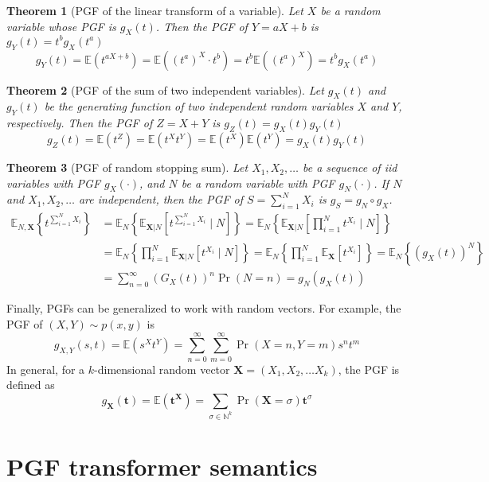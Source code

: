 \documentclass[a4paper]{article}
\newcommand{\E}{ \mathbb{E} }
\newtheorem{theorem}{Theorem}[section]
\begin{document}
\begin{theorem}[PGF of the linear transform of a variable]
	Let \(X\) be a random variable whose PGF is \(g_X(t)\).
	Then the PGF of \(Y=aX+b\) is \(g_Y(t) = t^b g_X(t^a)\)
	\[
		g_Y(t)
		= \E(t^{aX+b})
		= \E({(t^a)}^X \cdot t^b)
		= t^b \E({(t^a)}^X )
		= t^b g_X(t^a)
	\]
\end{theorem}
\begin{theorem}[PGF of the sum of two independent variables]
	Let \(g_X(t)\) and \(g_Y(t)\) be the generating function of two independent random variables \(X\) and \(Y\), respectively. Then the PGF of \(Z=X+Y\) is \(g_Z(t) = g_X(t)g_Y(t)\)
	\[
		g_Z(t) = \E(t^Z) = \E(t^X t^Y) = \E(t^X) \E(t^Y) = g_X(t) g_Y(t)
	\]
\end{theorem}
\begin{theorem}[PGF of random stopping sum]
	Let \(X_1, X_2, \ldots\) be a sequence of iid variables with PGF \(g_X(\cdot)\),
	and \(N\) be a random variable with PGF \(g_N(\cdot)\).
	If \(N\) and \(X_1,X_2,\ldots\) are independent, then the PGF of \(S=\sum_{i=1}^{N} X_i\) is \(g_S = g_N\circ g_X\).
	\begin{align*}
		\E_{N,\mathbf{X}}\left\{ t^{\sum_{i=1}^N X_i} \right\}
		 & = \E_N\left\{ \E_{\mathbf{X}|N}\left[ t^{\sum_{i=1}^N X_i} \mid N \right] \right\}
		= \E_N\left\{ \E_{\mathbf{X}|N}\left[ \prod_{i=1}^N t^{X_i} \mid N \right] \right\}     \\
		 & = \E_N\left\{ \prod_{i=1}^N \E_{\mathbf{X}|N}\left[  t^{X_i} \mid N \right] \right\}
		= \E_N\left\{ \prod_{i=1}^N \E_{\mathbf{X}}\left[  t^{X_i} \right] \right\}
		= \E_N\left\{ {(g_X(t))}^N \right\}                                                     \\
		 & = \sum_{n=0}^{\infty} {(G_X(t))}^n \Pr(N=n)
		= g_N(g_X(t))
	\end{align*}
\end{theorem}

Finally, PGFs can be generalized to work with random vectors.
For example, the PGF of \((X,Y)\sim p(x,y)\) is
\[
	g_{X,Y}(s,t) = \E(s^X t^Y) = \sum_{n=0}^\infty \sum_{m=0}^\infty \Pr(X=n,Y=m) s^n t^m
\]
In general, for a \(k\)-dimensional random vector \(\mathbf{X}=(X_1,X_2,\ldots X_k)\), the PGF is defined as
\[
	g_{\mathbf{X}}(\mathbf{t}) = \E(\mathbf{t}^\mathbf{X}) = \sum_{\sigma\in\mathbb{N}^k} \Pr(\mathbf{X}=\sigma) \mathbf{t}^\sigma
\]

\section{PGF transformer semantics}
\end{document}
